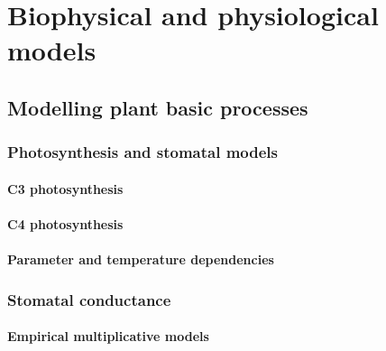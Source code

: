 \documentclass[
  oneside]{book}
\begin{document}
\hypertarget{part-biophysical-and-physiological-models}{%
\part{Biophysical and physiological models}\label{part-biophysical-and-physiological-models}}

\hypertarget{modelling-plant-basic-processes}{%
\chapter{Modelling plant basic processes}\label{modelling-plant-basic-processes}}


\hypertarget{photosynthesis-and-stomatal-models}{%
\section{Photosynthesis and stomatal models}\label{photosynthesis-and-stomatal-models}}

\hypertarget{c3-photosynthesis}{%
\subsection{C3 photosynthesis}\label{c3-photosynthesis}}

\hypertarget{c4-photosynthesis}{%
\subsection{C4 photosynthesis}\label{c4-photosynthesis}}

\hypertarget{parameter-and-temperature-dependencies}{%
\subsection{Parameter and temperature dependencies}\label{parameter-and-temperature-dependencies}}

\hypertarget{stomatal-conductance}{%
\section{Stomatal conductance}\label{stomatal-conductance}}

\hypertarget{empirical-multiplicative-models}{%
\subsection{Empirical multiplicative models}\label{empirical-multiplicative-models}}
\end{document}
